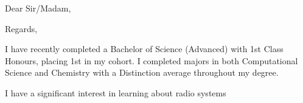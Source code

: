 


\recipient{~}{~}
\date{\today}
\opening{Dear Sir/Madam,}
\closing{Regards,}



\makelettertitle


I have recently completed a Bachelor of Science (Advanced) with 1st Class Honours, placing 1st in my cohort. I completed majors in both Computational Science and Chemistry with a Distinction average throughout my degree.


I have a significant interest in learning about radio systems 









\makeletterclosing


